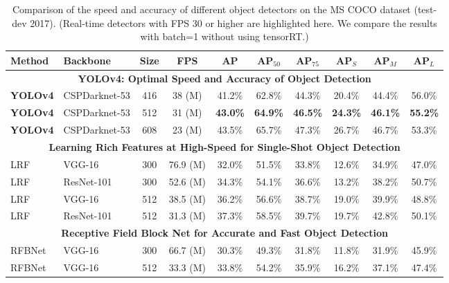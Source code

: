 \documentclass[10pt,twocolumn,letterpaper]{article}
\begin{document}
\begin{table*}[h]
	\centering
	\begin{threeparttable}[h]
		\footnotesize
		\caption{Comparison of the speed and accuracy of different object detectors on the MS COCO dataset (test-dev 2017). (Real-time detectors with FPS 30 or higher are highlighted here. We compare the results with batch=1 without using tensorRT.)}
		\label{table:maxwell}
		\begin{tabular}{llcccccccc}
			\toprule
			\textbf{Method} & \textbf{Backbone} & \textbf{Size} & \textbf{FPS} & \textbf{AP} & \textbf{AP$_{50}$} & \textbf{AP$_{75}$} & \textbf{AP$_S$} & \textbf{AP$_M$} & \textbf{AP$_L$} \\	
			\midrule
			\multicolumn{10}{c}{\textbf{YOLOv4: Optimal Speed and Accuracy of Object Detection}} \\
			\rowcolor{cyan}\textbf{YOLOv4} & CSPDarknet-53 & 416 & 38 (M) & 41.2\% & 62.8\% & 44.3\% & 20.4\% & 44.4\% & 56.0\% \\
			\rowcolor{cyan}\textbf{YOLOv4} & CSPDarknet-53 & 512 & 31 (M) & \textbf{43.0\%} & \textbf{64.9\%} & \textbf{46.5\%} & \textbf{24.3\%} & \textbf{46.1\%} & \textbf{55.2\%} \\
			\textbf{YOLOv4} & CSPDarknet-53 & 608 & 23 (M) & 43.5\% & 65.7\% & 47.3\% & 26.7\% & 46.7\% & 53.3\% \\
			\midrule
			\multicolumn{10}{c}{\textbf{Learning Rich Features at High-Speed for Single-Shot Object Detection \cite{wang2019learning}}} \\
			\rowcolor{cyan}LRF & VGG-16 & 300 & 76.9 (M) & 32.0\% & 51.5\% & 33.8\% & 12.6\% & 34.9\% & 47.0\% \\
			\rowcolor{cyan}LRF & ResNet-101 & 300 & 52.6 (M) & 34.3\% & 54.1\% & 36.6\% & 13.2\% & 38.2\% & 50.7\% \\
			\rowcolor{cyan}LRF & VGG-16 & 512 & 38.5 (M) & 36.2\% & 56.6\% & 38.7\% & 19.0\% & 39.9\% & 48.8\% \\
			\rowcolor{cyan}LRF & ResNet-101 & 512 & 31.3 (M) & 37.3\% & 58.5\% & 39.7\% & 19.7\% & 42.8\% & 50.1\% \\
			\midrule
			\multicolumn{10}{c}{\textbf{Receptive Field Block Net for Accurate and Fast Object Detection \cite{liu2018receptive}}} \\
			\rowcolor{cyan}RFBNet & VGG-16 & 300 & 66.7 (M) & 30.3\% & 49.3\% & 31.8\% & 11.8\% & 31.9\% & 45.9\% \\
			\rowcolor{cyan}RFBNet & VGG-16 & 512 & 33.3 (M) & 33.8\% & 54.2\% & 35.9\% & 16.2\% & 37.1\% & 47.4\% \\

\end{tabular}
\end{threeparttable}
\end{table*}
\end{document}
